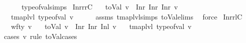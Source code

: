 \begin{isabellebody}
\ \ \ \ \ \ type{\isacharunderscore}{\kern0pt}of{\isacharunderscore}{\kern0pt}val{\isachardot}{\kern0pt}simps{\isacharparenleft}{\kern0pt}{}{\isacharparenright}{\kern0pt}{\isacharparenright}{\kern0pt}%
\endisatagproof
{\isafoldproof}%
%
\isadelimproof
\isanewline
%
\endisadelimproof
\isanewline
{}\isamarkupfalse%
\ InrrrC{}{\isacharcolon}{\kern0pt}\isanewline
\ \ \ {\isachardoublequoteopen}toVal{}{}{}{}\ v\ {\isacharequal}{\kern0pt}\ Inr\ {\isacharparenleft}{\kern0pt}Inr\ {\isacharparenleft}{\kern0pt}Inr\ v{\isacharprime}{\kern0pt}{\isacharparenright}{\kern0pt}{\isacharparenright}{\kern0pt}{\isachardoublequoteclose}\isanewline
\ \ \ {\isachardoublequoteopen}tmap{\isacharunderscore}{\kern0pt}lvl\ {\isacharparenleft}{\kern0pt}type{\isacharunderscore}{\kern0pt}of{\isacharunderscore}{\kern0pt}val\ v{\isacharparenright}{\kern0pt}\ {\isacharequal}{\kern0pt}\ {}{\isachardoublequoteclose}\isanewline
%
\isadelimproof
\ \ %
\endisadelimproof
%
\isatagproof
{}\isamarkupfalse%
\ assms\ tmap{\isacharunderscore}{\kern0pt}lvl{\isachardot}{\kern0pt}simps{\isacharparenleft}{\kern0pt}{}{\isacharparenright}{\kern0pt}\ toVal{}{}{}{}{\isachardot}{\kern0pt}elims\ \isamarkupfalse%
\ force%
\endisatagproof
{\isafoldproof}%
%
\isadelimproof
\isanewline
%
\endisadelimproof
\isanewline
{}\isamarkupfalse%
\ InrrlC{}{\isacharcolon}{\kern0pt}\isanewline
\ \ \ {\isachardoublequoteopen}wf{\isacharunderscore}{\kern0pt}ty\ v{\isachardoublequoteclose}\isanewline
\ \ \ {\isachardoublequoteopen}toVal{}{}{}{}\ v\ {\isacharequal}{\kern0pt}\ Inr\ {\isacharparenleft}{\kern0pt}Inr\ {\isacharparenleft}{\kern0pt}Inl\ v{\isacharprime}{\kern0pt}{\isacharparenright}{\kern0pt}{\isacharparenright}{\kern0pt}{\isachardoublequoteclose}\isanewline
\ \ \ {\isachardoublequoteopen}tmap{\isacharunderscore}{\kern0pt}lvl\ {\isacharparenleft}{\kern0pt}type{\isacharunderscore}{\kern0pt}of{\isacharunderscore}{\kern0pt}val\ v{\isacharparenright}{\kern0pt}\ {\isacharequal}{\kern0pt}\ {}{\isachardoublequoteclose}\isanewline
%
\isadelimproof
\ \ %
\endisadelimproof
%
\isatagproof
{}\isamarkupfalse%
\ {\isacharparenleft}{\kern0pt}cases\ v\ rule{\isacharcolon}{\kern0pt}\ toVal{}{}{}{}{\isachardot}{\kern0pt}cases{\isacharparenright}{\kern0pt}\isanewline

\end{isabellebody}
